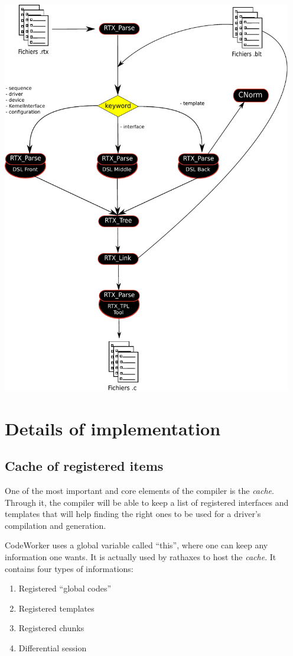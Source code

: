 \documentclass[american]{rtxreport}
\begin{document}
\includegraphics[width=0.95\textwidth]{logigramme.pdf}



\chapter{Details of implementation}


\section{Cache of registered items}

One of the most important and core elements of the compiler is the
\emph{cache}.  Through it, the compiler will be able to keep a list of
registered interfaces and templates that will help finding the right ones to be
used for a driver's compilation and generation.

CodeWorker uses a global variable called ``this'', where one can keep any
information one wants. It is actually used by rathaxes to host the
\emph{cache}. It contains four types of informations:
\begin{enumerate}
    \item Registered ``global codes''
    \item Registered templates
    \item Registered chunks
    \item Differential session
\end{enumerate}
\end{document}
